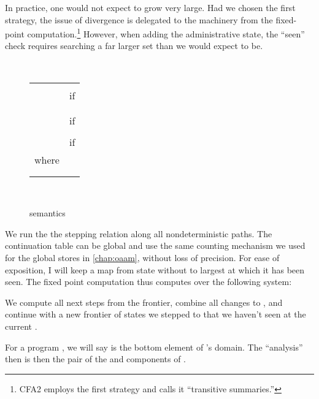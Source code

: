 In practice, one would not expect  to grow very large.
Had we chosen the first strategy, the issue of divergence is delegated to the machinery from the fixed-point computation.\footnote{CFA2 employs the first strategy and calls it ``transitive summaries.''}
However, when adding the administrative state, the ``seen'' check requires searching a far larger set than we would expect  to be.

\begin{figure}
  \centering
   \quad  \\
  \begin{tabular}{r|l}
    \hline\vspace{-3mm}\\
    
    &
     if 
    \\

    &
    
    \\

    &
     \\
    &
    if  \\

    &
     \\
    & if  \\
    where &  \\
    &  \\
    & 
  \end{tabular} \\
  \caption{ semantics}
  \label{fig:cesikkstar-semantics}
\end{figure}

We run the the stepping relation along all nondeterministic paths.
The continuation table can be global and use the same counting mechanism we used for the global stores in \autoref{chap:oaam}, without loss of precision.
For ease of exposition, I will keep a map from state without  to largest  at which it has been seen.
The fixed point computation thus computes over the following system:


We compute all next steps from the frontier, combine all changes to , and continue with a new frontier of states we stepped to that we haven't seen at the current .


For a program , we will say  is the bottom element of 's domain.
The ``analysis'' then is then the pair of the  and  components of .

